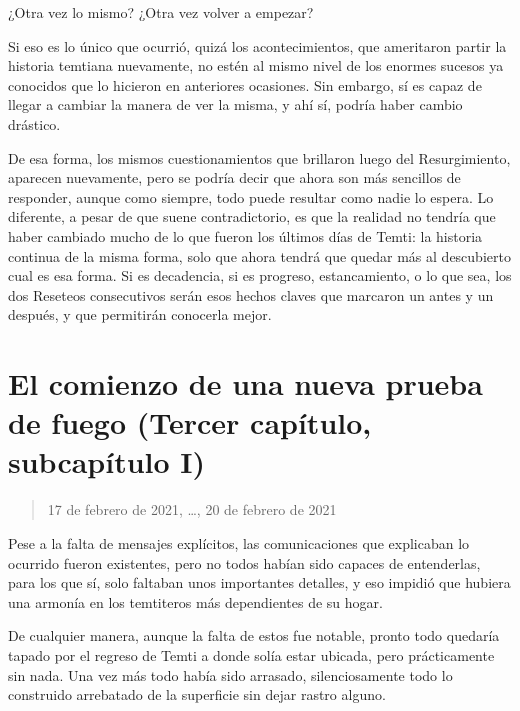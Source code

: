 \documentclass[
  spanish,
]{book}
\begin{document}
¿Otra vez lo mismo? ¿Otra vez volver a empezar?

Si eso es lo único que ocurrió, quizá los acontecimientos, que ameritaron partir la historia temtiana nuevamente, no estén al mismo nivel de los enormes sucesos ya conocidos que lo hicieron en anteriores ocasiones. Sin embargo, sí es capaz de llegar a cambiar la manera de ver la misma, y ahí sí, podría haber cambio drástico.

De esa forma, los mismos cuestionamientos que brillaron luego del Resurgimiento, aparecen nuevamente, pero se podría decir que ahora son más sencillos de responder, aunque como siempre, todo puede resultar como nadie lo espera.
Lo diferente, a pesar de que suene contradictorio, es que la realidad no tendría que haber cambiado mucho de lo que fueron los últimos días de Temti: la historia continua de la misma forma, solo que ahora tendrá que quedar más al descubierto cual es esa forma. Si es decadencia, si es progreso, estancamiento, o lo que sea, los dos Reseteos consecutivos serán esos hechos claves que marcaron un antes y un después, y que permitirán conocerla mejor.

\hypertarget{el-comienzo-de-una-nueva-prueba-de-fuego-tercer-capuxedtulo-subcapuxedtulo-i}{%
\section{El comienzo de una nueva prueba de fuego (Tercer capítulo, subcapítulo I)}\label{el-comienzo-de-una-nueva-prueba-de-fuego-tercer-capuxedtulo-subcapuxedtulo-i}}

\begin{quote}
17 de febrero de 2021, \ldots, 20 de febrero de 2021
\end{quote}

Pese a la falta de mensajes explícitos, las comunicaciones que explicaban lo ocurrido fueron existentes, pero no todos habían sido capaces de entenderlas, para los que sí, solo faltaban unos importantes detalles, y eso impidió que hubiera una armonía en los temtiteros más dependientes de su hogar.

De cualquier manera, aunque la falta de estos fue notable, pronto todo quedaría tapado por el regreso de Temti a donde solía estar ubicada, pero prácticamente sin nada. Una vez más todo había sido arrasado, silenciosamente todo lo construido arrebatado de la superficie sin dejar rastro alguno.
\end{document}
